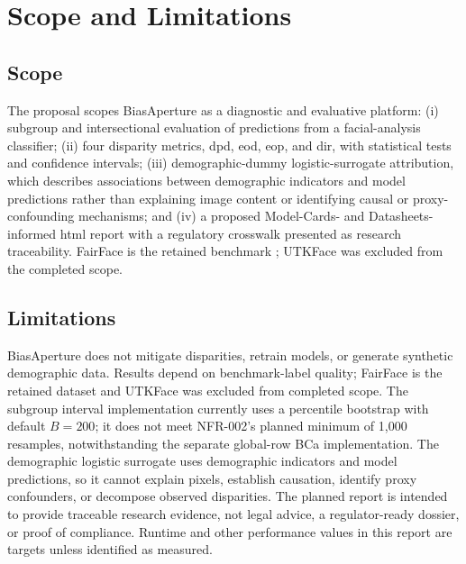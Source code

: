\section{Scope and Limitations}

\subsection{Scope}
The proposal scopes BiasAperture as a diagnostic and evaluative platform: (i) subgroup and intersectional evaluation of predictions from a facial-analysis classifier; (ii) four disparity metrics, \gls{dpd}, \gls{eod}, \gls{eop}, and \gls{dir}, with statistical tests and confidence intervals; (iii) demographic-dummy logistic-surrogate attribution, which describes associations between demographic indicators and model predictions rather than explaining image content or identifying causal or proxy-confounding mechanisms; and (iv) a proposed Model-Cards- and Datasheets-informed \gls{html} report with a regulatory crosswalk presented as research traceability. FairFace is the retained benchmark \cite{karkkainen2021fairface}; UTKFace was excluded from the completed scope.

\subsection{Limitations}
BiasAperture does not mitigate disparities, retrain models, or generate synthetic demographic data. Results depend on benchmark-label quality; FairFace is the retained dataset and UTKFace was excluded from completed scope. The subgroup interval implementation currently uses a percentile bootstrap with default \(B=200\); it does not meet NFR-002's planned minimum of 1{,}000 resamples, notwithstanding the separate global-row BCa implementation. The demographic logistic surrogate uses demographic indicators and model predictions, so it cannot explain pixels, establish causation, identify proxy confounders, or decompose observed disparities. The planned report is intended to provide traceable research evidence, not legal advice, a regulator-ready dossier, or proof of compliance. Runtime and other performance values in this report are targets unless identified as measured.
